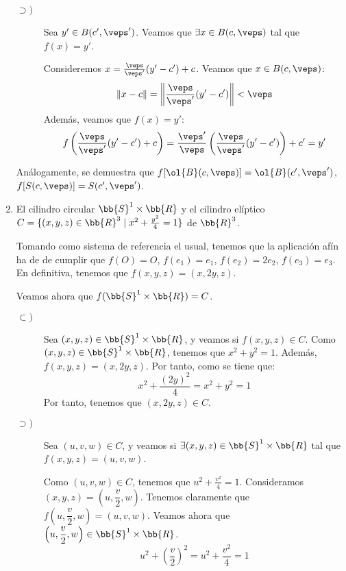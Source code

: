 \begin{ejercicio}
\begin{enumerate}
\begin{description}
            \item[$\supset)$] Sea $y'\in B(c', \veps')$. Veamos que $\exists x\in B(c,\veps)$ tal que $f(x)=y'$.

            Consideremos $x= \frac{\veps}{\veps'}(y'-c')+c$. Veamos que $x\in B(c,\veps)$:
            \begin{equation*}
                \|x-c\| = \left\|\frac{\veps}{\veps'}(y'-c')\right\| < \veps
            \end{equation*}
            Además, veamos que $f(x)=y'$:
            \begin{equation*}
                f\left(\frac{\veps}{\veps'}(y'-c')+c\right) = \frac{\veps'}{\veps}\left(\frac{\veps}{\veps'}(y'-c')\right)+c' = y'
            \end{equation*}
        \end{description}

        Análogamente, se demuestra que $f[\ol{B}(c,\veps)]=\ol{B}(c',\veps')$, $f[S(c,\veps)]=S(c',\veps')$.
        
        \item El cilindro circular $\bb{S}^1 \times \bb{R}$ y el cilindro elíptico $C = \{(x, y, z) \in \bb{R}^3 \mid x^2 +\frac{y^2}{4} = 1\}$ de $\bb{R}^3$.

        Tomando como sistema de referencia el usual, tenemos que la aplicación afín ha de de cumplir que $f(O)=O$, $f(e_1)=e_1$, $f(e_2)=2e_2$, $f(e_3)=e_3$. En definitiva, tenemos que $f(x,y,z)=(x,2y,z)$.

        Veamos ahora que $f(\bb{S}^1\times \bb{R})=C$.
        \begin{description}
            \item[$\subset)$]
            Sea $(x,y,z)\in \bb{S}^1\times \bb{R}$, y veamos si $f(x,y,z)\in C$. Como $(x,y,z)\in \bb{S}^1\times \bb{R}$, tenemos que $x^2+y^2=1$. Además, $f(x,y,z)=(x,2y,z)$. Por tanto, como se tiene que:
            \begin{equation*}
                x^2 + \frac{(2y)^2}{4}=x^2+y^2 = 1
            \end{equation*}
            Por tanto, tenemos que $(x,2y,z)\in C$.

            \item[$\supset)$] Sea $(u,v,w)\in C$, y veamos si $\exists (x,y,z)\in \bb{S}^1\times \bb{R}$ tal que $f(x,y,z)=(u,v,w)$.

            Como $(u,v,w)\in C$, tenemos que $u^2 + \frac{v^2}{4}=1$. Consideramos $(x,y,z)=\left(u,\dfrac{v}{2}, w\right)$. Tenemos claramente que $f\left(u,\dfrac{v}{2}, w\right)=(u,v,w)$. Veamos ahora que $\left(u,\dfrac{v}{2}, w\right)\in \bb{S}^1\times \bb{R}$.
            $$u^2 + \left(\frac{v}{2}\right)^2=u^2 + \frac{v^2}{4}=1$$
        \end{description}
    \end{enumerate}
\end{ejercicio}

